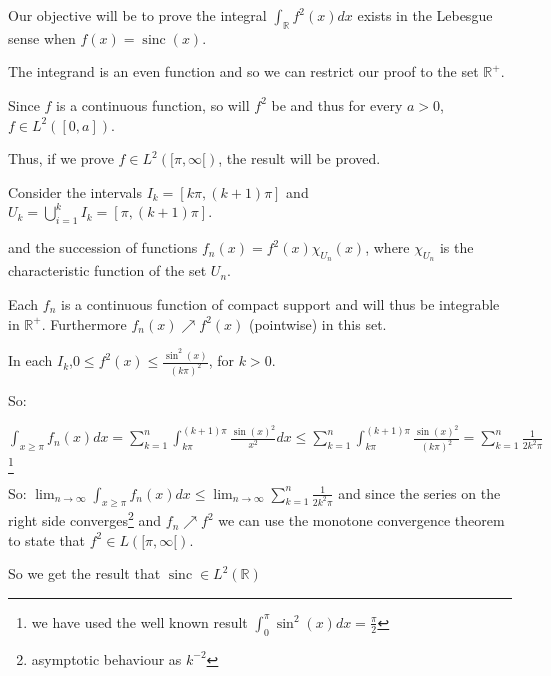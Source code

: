 \documentclass[12pt]{article}
\begin{document}
Our objective will be to prove the integral $\int_{\mathbb{R}} f^2(x) dx$ exists in the Lebesgue sense when $f(x) = \operatorname{sinc}(x)$.

The integrand is an even function and so we can restrict our proof to the set $\mathbb{R}^+$.

Since $f$ is a continuous function, so will $f^2$ be and thus for every $a>0$, $f \in L^2([0,a])$.

Thus, if we prove $f \in L^2([\pi,\infty[)$, the result will be proved.

Consider the intervals $I_k = [k\pi, (k+1)\pi]$ and $U_k = \bigcup_{i=1}^k I_k = [\pi, (k+1)\pi]$.

and the succession of functions $f_n(x) = f^2(x)\chi_{U_n}(x)$, where $\chi_{U_n}$ is the characteristic function of the set $U_n$.

Each $f_n$ is a continuous function of compact support and will thus be integrable in $\mathbb{R}^+$. Furthermore $f_n(x) \nearrow f^2(x)$ (pointwise) in this set.

In each $I_k$,$ 0 \le f^2(x) \le \frac{\sin^2(x)}{(k\pi)^2}$, for $k>0$.

So:

$ \displaystyle \int_{x\ge \pi} f_n(x) dx = \sum_{k=1}^{n} \int_{k\pi}^{(k+1)\pi} \frac{\sin(x)^2}{x^2} dx \le \sum_{k=1}^{n} \int_{k\pi}^{(k+1)\pi} \frac{\sin(x)^2}{(k\pi)^2} = \sum_{k=1}^{n} \frac{1}{2k^2\pi} $
\footnote{we have used the well known result $\int_{0}^{\pi}\sin^2(x) dx = \frac{\pi}{2}$}

So: $\lim_{n\to \infty} \int_{x\ge \pi}f_n(x) dx \le  \lim_{n\to \infty} \sum_{k=1}^{n} \frac{1}{2k^2\pi}$ and since the series on the right side converges\footnote{asymptotic behaviour as $k^{-2}$} and $f_n \nearrow f^2$ we can use the monotone convergence theorem to state that $f^2 \in L([\pi,\infty[)$.

So we get the result that $\operatorname{sinc} \in L^2(\mathbb{R})$
\end{document}
